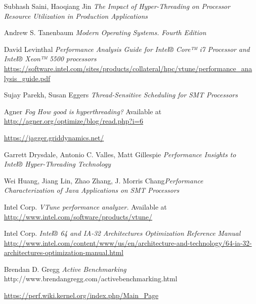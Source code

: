 \documentclass[12pt]{article}
\begin{document}
\begin{thebibliography}{1}

   Subhash Saini, Haoqiang Jin {\em The Impact of Hyper-Threading on Processor Resource Utilization in Production Applications}

   Andrew S. Tanenbaum {\em Modern Operating Systems. Fourth Edition}

   David Levinthal {\em Performance Analysis Guide for Intel® Core™ i7 Processor and Intel® Xeon™ 5500 processors} \url{https://software.intel.com/sites/products/collateral/hpc/vtune/performance_analysis_guide.pdf}
  
   Sujay Parekh, Susan Eggers {\em Thread-Sensitive Scheduling for SMT Processors}
  
   Agner {\em Fog How good is hyperthreading?} Available at \url{http://agner.org/optimize/blog/read.php?i=6}

   \url{https://jagger.griddynamics.net/}
  
   Garrett Drysdale, Antonio C. Valles, Matt Gillespie {\em Performance Insights to Intel® Hyper-Threading Technology}
  
  \bibitem{} Wei Huang, Jiang Lin, Zhao Zhang, J. Morris Chang{\em Performance Characterization of Java Applications on SMT Processors}
  
   Intel Corp. {\em VTune performance analyzer.} Available at \url{http://www.intel.com/software/products/vtune/}
  
   Intel Corp. {\em Intel® 64 and IA-32 Architectures Optimization Reference Manual} \url{http://www.intel.com/content/www/us/en/architecture-and-technology/64-ia-32-architectures-optimization-manual.html}

   Brendan D. Gregg {\em Active Benchmarking} http://www.brendangregg.com/activebenchmarking.html
  
   \url{https://perf.wiki.kernel.org/index.php/Main_Page}

\end{thebibliography}
\end{document}
